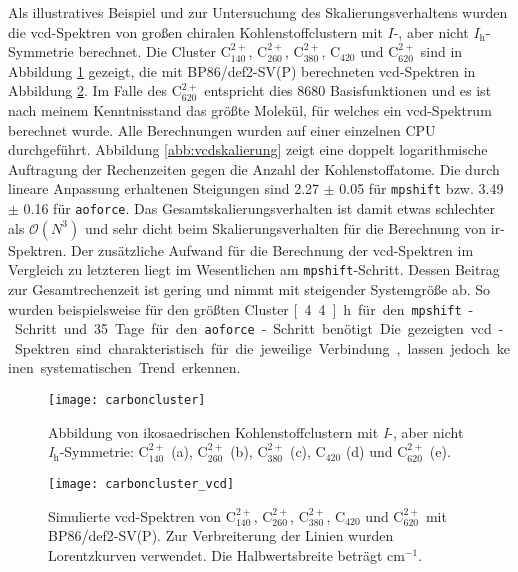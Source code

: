 \FloatBarrier
Als illustratives Beispiel und zur Untersuchung des Skalierungsverhaltens wurden die \ac{vcd}-Spektren von großen chiralen Kohlenstoffclustern mit $I$-, aber nicht $I_\textrm{h}$-Symmetrie berechnet. Die Cluster C$^{2+}_{140}$, C$^{2+}_{260}$, C$^{2+}_{380}$, C$_{420}$ und C$^{2+}_{620}$ sind in Abbildung \ref{abb:carboncluster} gezeigt, die mit BP86/def2-SV(P) berechneten \ac{vcd}-Spektren in Abbildung \ref{abb:carboncluster_vcd}. Im Falle des C$^{2+}_{620}$ entspricht dies 8680 Basisfunktionen und es ist nach meinem Kenntnisstand das größte Molekül, für welches ein \ac{vcd}-Spektrum berechnet wurde. Alle Berechnungen wurden auf einer einzelnen CPU durchgeführt. Abbildung \ref{abb:vcdskalierung} zeigt eine doppelt logarithmische Auftragung der Rechenzeiten gegen die Anzahl der Kohlenstoffatome. Die durch lineare Anpassung erhaltenen Steigungen sind 2.27 $\pm$ 0.05 für \texttt{mpshift} bzw. 3.49 $\pm$ 0.16 für \texttt{aoforce}. Das Gesamtskalierungsverhalten ist damit etwas schlechter als $\mathcal{O}(N^3)$ und sehr dicht beim Skalierungsverhalten für die Berechnung von \ac{ir}-Spektren. Der zusätzliche Aufwand für die Berechnung der \ac{vcd}-Spektren im Vergleich zu letzteren liegt im Wesentlichen am \texttt{mpshift}-Schritt. Dessen Beitrag zur Gesamtrechenzeit ist gering und nimmt mit steigender Systemgröße ab. So wurden beispielsweise für den größten Cluster \unit[4.4]{h} für den \texttt{mpshift}-Schritt und 35 Tage für den \texttt{aoforce}-Schritt benötigt. Die gezeigten \ac{vcd}-Spektren sind charakteristisch für die jeweilige Verbindung, lassen jedoch keinen systematischen Trend erkennen.
\begin{figure}[ht!]
	\centering
	\texttt{[image: carboncluster]}
	\captionsetup{figurewithin = chapter}
	\captionsetup{font=small, labelfont=bf}\caption[Abbildung von ikosaedrischen Kohlenstoffclustern]{Abbildung von ikosaedrischen Kohlenstoffclustern mit \textit{I}-, aber nicht \textit{I}$_\textrm{h}$-Symmetrie: C$^{2+}_{140}$ \textsf{(a)}, C$^{2+}_{260}$ \textsf{(b)}, C$^{2+}_{380}$ \textsf{(c)}, C$_{420}$ \textsf{(d)} und C$^{2+}_{620}$ \textsf{(e)}.}
\label{abb:carboncluster}
\end{figure}

\begin{figure}[ht!]
	\centering
	\texttt{[image: carboncluster\_vcd]}
	\captionsetup{figurewithin = chapter}
	\captionsetup{font=small, labelfont=bf}\caption[Simulierte \ac{vcd}-Spektren von ikosaedrischen Kohlenstoffclustern]{Simulierte \ac{vcd}-Spektren von C$^{2+}_{140}$, C$^{2+}_{260}$, C$^{2+}_{380}$, C$_{420}$ und C$^{2+}_{620}$ mit BP86/def2-SV(P). Zur Verbreiterung der Linien wurden Lorentzkurven verwendet. Die Halbwertsbreite beträgt \unit[4]{cm$^{-1}$}.}
\label{abb:carboncluster_vcd}
\end{figure}

